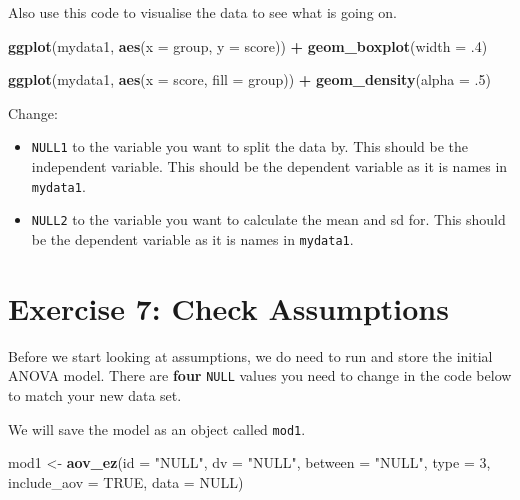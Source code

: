 \documentclass[
]{book}
\newenvironment{Shaded}{\begin{snugshade}}{\end{snugshade}}
\newcommand{\AttributeTok}[1]{\textcolor[rgb]{0.13,0.29,0.53}{#1}}
\newcommand{\ConstantTok}[1]{\textcolor[rgb]{0.56,0.35,0.01}{#1}}
\newcommand{\DecValTok}[1]{\textcolor[rgb]{0.00,0.00,0.81}{#1}}
\newcommand{\FunctionTok}[1]{\textcolor[rgb]{0.13,0.29,0.53}{\textbf{#1}}}
\newcommand{\NormalTok}[1]{#1}
\newcommand{\OtherTok}[1]{\textcolor[rgb]{0.56,0.35,0.01}{#1}}
\newcommand{\SpecialCharTok}[1]{\textcolor[rgb]{0.81,0.36,0.00}{\textbf{#1}}}
\newcommand{\StringTok}[1]{\textcolor[rgb]{0.31,0.60,0.02}{#1}}
\let\oldsection\section
\renewcommand{\section}{\needspace{5\baselineskip}\oldsection}
\begin{document}
Also use this code to visualise the data to see what is going on.

\begin{Shaded}
\begin{Highlighting}[]
\FunctionTok{ggplot}\NormalTok{(mydata1, }\FunctionTok{aes}\NormalTok{(}\AttributeTok{x =}\NormalTok{ group, }\AttributeTok{y =}\NormalTok{ score)) }\SpecialCharTok{+}
  \FunctionTok{geom\_boxplot}\NormalTok{(}\AttributeTok{width =}\NormalTok{ .}\DecValTok{4}\NormalTok{)}
  
\FunctionTok{ggplot}\NormalTok{(mydata1, }\FunctionTok{aes}\NormalTok{(}\AttributeTok{x =}\NormalTok{ score, }\AttributeTok{fill =}\NormalTok{ group)) }\SpecialCharTok{+}
  \FunctionTok{geom\_density}\NormalTok{(}\AttributeTok{alpha =}\NormalTok{ .}\DecValTok{5}\NormalTok{)}
\end{Highlighting}
\end{Shaded}

Change:

\begin{itemize}
\item
  \texttt{NULL1} to the variable you want to split the data by. This should be the independent variable. This should be the dependent variable as it is names in \texttt{mydata1}.
\item
  \texttt{NULL2} to the variable you want to calculate the mean and sd for. This should be the dependent variable as it is names in \texttt{mydata1}.
\end{itemize}

\section{Exercise 7: Check Assumptions}\label{exercise-7-check-assumptions-1}

Before we start looking at assumptions, we do need to run and store the initial ANOVA model. There are \textbf{four} \texttt{NULL} values you need to change in the code below to match your new data set.

We will save the model as an object called \texttt{mod1}.

\begin{Shaded}
\begin{Highlighting}[]
\NormalTok{mod1 }\OtherTok{\textless{}{-}} \FunctionTok{aov\_ez}\NormalTok{(}\AttributeTok{id =} \StringTok{"NULL"}\NormalTok{,}
              \AttributeTok{dv =} \StringTok{"NULL"}\NormalTok{,}
              \AttributeTok{between =} \StringTok{"NULL"}\NormalTok{,}
              \AttributeTok{type =} \DecValTok{3}\NormalTok{,}
              \AttributeTok{include\_aov =} \ConstantTok{TRUE}\NormalTok{,}
              \AttributeTok{data =} \ConstantTok{NULL}\NormalTok{)}
\end{Highlighting}
\end{Shaded}
\end{document}

